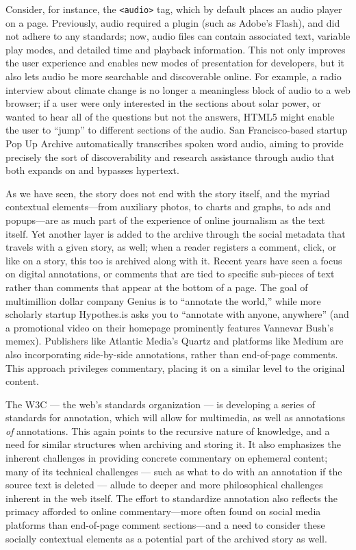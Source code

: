 Consider, for instance, the \texttt{<audio>} tag, which by default places an audio player on a page. Previously, audio required a plugin (such as Adobe's Flash), and did not adhere to any standards; now, audio files can contain associated text, variable play modes, and detailed time and playback information. This not only improves the user experience and enables new modes of presentation for developers, but it also lets audio be more searchable and discoverable online. For example, a radio interview about climate change is no longer a meaningless block of audio to a web browser; if a user were only interested in the sections about solar power, or wanted to hear all of the questions but not the answers, HTML5 might enable the user to ``jump'' to different sections of the audio. San Francisco-based startup Pop Up Archive automatically transcribes spoken word audio, aiming to provide precisely the sort of discoverability and research assistance through audio that both expands on and bypasses hypertext.

As we have seen, the story does not end with the story itself, and the myriad contextual elements---from auxiliary photos, to charts and graphs, to ads and popups---are as much part of the experience of online journalism as the text itself. Yet another layer is added to the archive through the social metadata that travels with a given story, as well; when a reader registers a comment, click, or like on a story, this too is archived along with it. Recent years have seen a focus on digital annotations, or comments that are tied to specific sub-pieces of text rather than comments that appear at the bottom of a page. The goal of multimillion dollar company Genius is to ``annotate the world,'' while more scholarly startup Hypothes.is asks you to ``annotate with anyone, anywhere'' (and a promotional video on their homepage prominently features Vannevar Bush's memex). Publishers like Atlantic Media's Quartz and platforms like Medium are also incorporating side-by-side annotations, rather than end-of-page comments. This approach privileges commentary, placing it on a similar level to the original content.

The W3C --- the web's standards organization --- is developing a series of standards for annotation, which will allow for multimedia, as well as annotations \emph{of} annotations. This again points to the recursive nature of knowledge, and a need for similar structures when archiving and storing it. It also emphasizes the inherent challenges in providing concrete commentary on ephemeral content; many of its technical challenges --- such as what to do with an annotation if the source text is deleted --- allude to deeper and more philosophical challenges inherent in the web itself. The effort to standardize annotation also reflects the primacy afforded to online commentary---more often found on social media platforms than end-of-page comment sections---and a need to consider these socially contextual elements as a potential part of the archived story as well.

